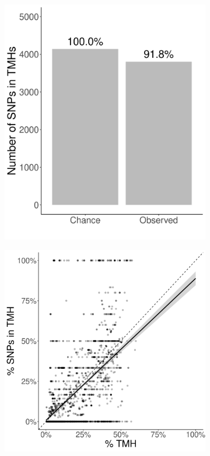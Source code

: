 \begin{figure}[!htbp]
  \centering
  \begin{subfigure}[t]{0.45\textwidth}
    \centering
    \caption{}
    \includegraphics[width=\linewidth]{ncbi_peregrine_results/fig_conservation.png}
    \label{fig:conservation}
  \end{subfigure}
  \hfill
  \begin{subfigure}[t]{0.45\textwidth}
    \centering
    \caption{}
    \includegraphics[width=\linewidth]{ncbi_peregrine_results/fig_f_snps_found_and_expected_bw.png}
    \label{fig:f_snps_found_and_expected}
  \end{subfigure}
  

\end{figure}
